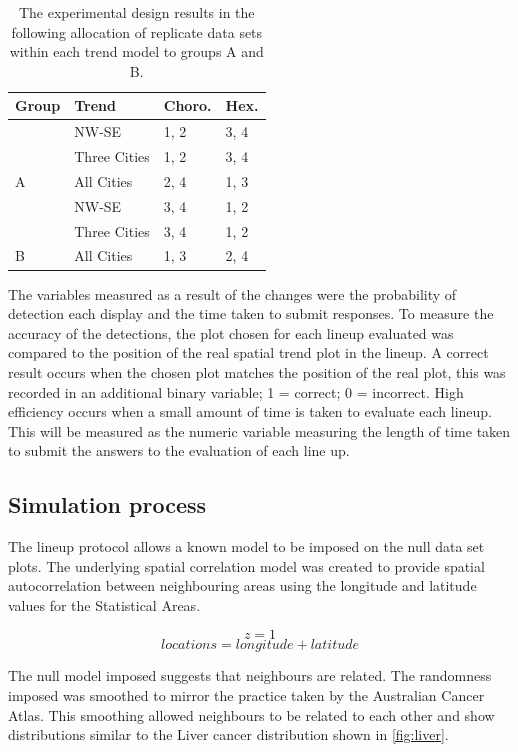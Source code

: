 \documentclass[conference,final,]{IEEEtran}
\begin{document}
\begin{table}

\caption{\label{tab:exp-design}The experimental design results in the following allocation of replicate data sets within each trend model to groups A and B.}
\centering
\begin{tabular}[t]{llll}
\toprule
Group & Trend & Choro. & Hex.\\
\midrule
 & NW-SE & 1, 2 & 3, 4\\
\cmidrule{2-4}
 & Three Cities & 1, 2 & 3, 4\\
\cmidrule{2-4}
\multirow{-3}{*}{\raggedright\arraybackslash A} & All Cities & 2, 4 & 1, 3\\
\cmidrule{1-4}
 & NW-SE & 3, 4 & 1, 2\\
\cmidrule{2-4}
 & Three Cities & 3, 4 & 1, 2\\
\cmidrule{2-4}
\multirow{-3}{*}{\raggedright\arraybackslash B} & All Cities & 1, 3 & 2, 4\\
\bottomrule
\end{tabular}
\end{table}

The variables measured as a result of the changes were the probability of detection each display and the time taken to submit responses.
To measure the accuracy of the detections, the plot chosen for each lineup evaluated was compared to the position of the real spatial trend plot in the lineup. A correct result occurs when the chosen plot matches the position of the real plot, this was recorded in an additional binary variable; 1 = correct; 0 = incorrect.
High efficiency occurs when a small amount of time is taken to evaluate each lineup. This will be measured as the numeric variable measuring the length of time taken to submit the answers to the evaluation of each line up.

\hypertarget{simulation-process}{%
\subsection{Simulation process}\label{simulation-process}}

The lineup protocol allows a known model to be imposed on the null data set plots.
The underlying spatial correlation model was created to provide spatial autocorrelation between neighbouring areas using the longitude and latitude values for the Statistical Areas.

\[z = 1\]
\[locations = longitude + latitude\]

The null model imposed suggests that neighbours are related. The randomness imposed was smoothed to mirror the practice taken by the Australian Cancer Atlas. This smoothing allowed neighbours to be related to each other and show distributions similar to the Liver cancer distribution shown in \ref{fig:liver}.
\end{document}
